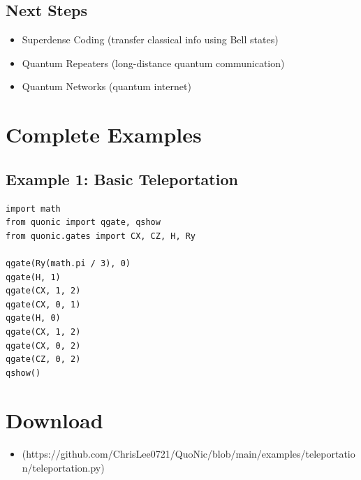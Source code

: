 \documentclass[12pt,a4paper]{article}
\begin{document}
\subsection{Next Steps}
\begin{itemize}
  \item Superdense Coding (transfer classical info using Bell states)
  \item Quantum Repeaters (long-distance quantum communication)
  \item Quantum Networks (quantum internet)
\end{itemize}

\section{Complete Examples}

\subsection{Example 1: Basic Teleportation}

\begin{verbatim}
import math
from quonic import qgate, qshow
from quonic.gates import CX, CZ, H, Ry

qgate(Ry(math.pi / 3), 0)
qgate(H, 1)
qgate(CX, 1, 2)
qgate(CX, 0, 1)
qgate(H, 0)
qgate(CX, 1, 2)
qgate(CX, 0, 2)
qgate(CZ, 0, 2)
qshow()
\end{verbatim}

\section{Download}

\begin{itemize}
  \item [teleportation.py](https://github.com/ChrisLee0721/QuoNic/blob/main/examples/teleportation/teleportation.py)
\end{itemize}
\end{document}

